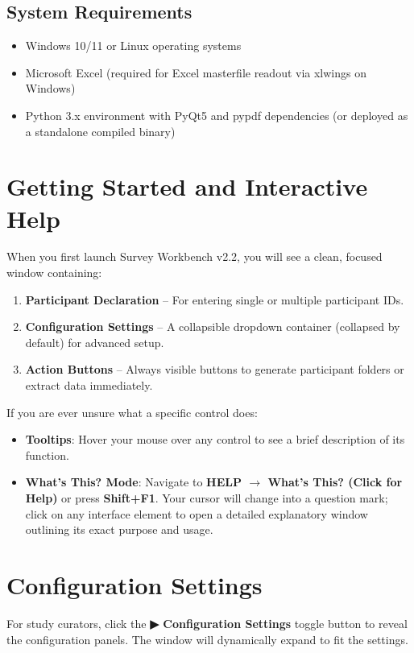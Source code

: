\documentclass[11pt,a4paper]{article}
\begin{document}
\subsection{System Requirements}
\begin{itemize}
    \item Windows 10/11 or Linux operating systems
    \item Microsoft Excel (required for Excel masterfile readout via xlwings on Windows)
    \item Python 3.x environment with PyQt5 and pypdf dependencies (or deployed as a standalone compiled binary)
\end{itemize}

\section{Getting Started and Interactive Help}

When you first launch Survey Workbench v2.2, you will see a clean, focused window containing:
\begin{enumerate}
    \item \textbf{Participant Declaration} -- For entering single or multiple participant IDs.
    \item \textbf{Configuration Settings} -- A collapsible dropdown container (collapsed by default) for advanced setup.
    \item \textbf{Action Buttons} -- Always visible buttons to generate participant folders or extract data immediately.
\end{enumerate}

If you are ever unsure what a specific control does:
\begin{itemize}
    \item \textbf{Tooltips}: Hover your mouse over any control to see a brief description of its function.
    \item \textbf{What's This? Mode}: Navigate to \textbf{HELP $\rightarrow$ What's This? (Click for Help)} or press \textbf{Shift+F1}. Your cursor will change into a question mark; click on any interface element to open a detailed explanatory window outlining its exact purpose and usage.
\end{itemize}

\section{Configuration Settings}

For study curators, click the \textbf{▶ Configuration Settings} toggle button to reveal the configuration panels. The window will dynamically expand to fit the settings.
\end{document}
